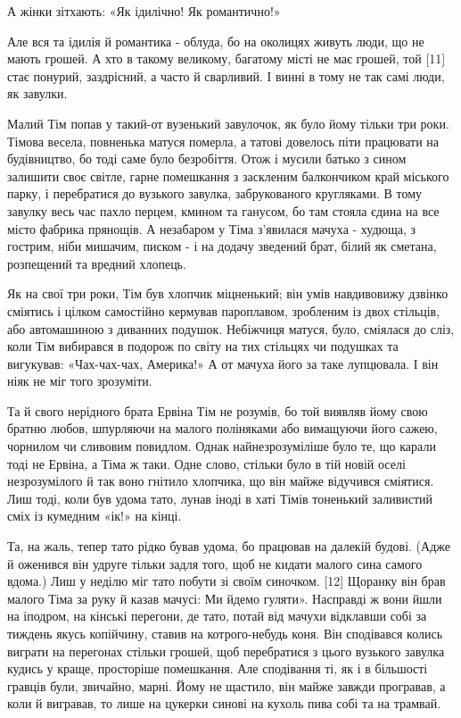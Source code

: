 А жінки зітхають: «Як ідилічно! Як романтично!»

Але вся та ідилія й романтика - облуда, бо на околицях живуть люди, що не мають
грошей. А хто в такому великому, багатому місті не має грошей, той [11] стає
понурий, заздрісний, а часто й сварливий. І винні в тому не так самі люди, як
завулки.

Малий Тім попав у такий-от вузенький завулочок, як було йому тільки три роки.
Тімова весела, повненька матуся померла, а татові довелось піти працювати на
будівництво, бо тоді саме було безробіття. Отож і мусили батько з сином
залишити своє світле, гарне помешкання з заскленим балкончиком край міського
парку, і перебратися до вузького завулка, забрукованого кругляками. В тому
завулку весь час пахло перцем, кмином та ганусом, бо там стояла єдина на все
місто фабрика прянощів. А незабаром у Тіма з'явилася мачуха - худюща, з
гострим, ніби мишачим, писком - і на додачу зведений брат, білий як сметана,
розпещений та вредний хлопець.

Як на свої три роки, Тім був хлопчик міцненький; він умів навдивовижу дзвінко
сміятись і цілком самостійно кермував пароплавом, зробленим із двох стільців,
або автомашиною з диванних подушок. Небіжчиця матуся, було, сміялася до сліз,
коли Тім вибирався в подорож по світу на тих стільцях чи подушках та вигукував:
«Чах-чах-чах, Америка!» А от мачуха його за таке лупцювала. І він ніяк не міг
того зрозуміти.

Та й свого нерідного брата Ервіна Тім не розумів, бо той виявляв йому свою
братню любов, шпурляючи на малого поліняками або вимащуючи його сажею, чорнилом
чи сливовим повидлом. Однак найнезрозуміліше було те, що карали тоді не Ервіна,
а Тіма ж таки. Одне слово, стільки було в тій новій оселі незрозумілого й так
воно гнітило хлопчика, що він майже відучився сміятися. Лиш тоді, коли був
удома тато, лунав іноді в хаті Тімів тоненький заливистий сміх із кумедним
«ік!» на кінці.

Та, на жаль, тепер тато рідко бував удома, бо працював на далекій будові. (Адже
й оженився він удруге тільки задля того, щоб не кидати малого сина самого
вдома.) Лиш у неділю міг тато побути зі своїм синочком. [12] Щоранку він брав
малого Тіма за руку й казав мачусі: Ми йдемо гуляти». Насправді ж вони йшли на
іподром, на кінські перегони, де тато, потай від мачухи відклавши собі за
тиждень якусь копійчину, ставив на котрого-небудь коня. Він сподівався колись
виграти на перегонах стільки грошей, щоб перебратися з цього вузького завулка
кудись у краще, просторіше помешкання. Але сподівання ті, як і в більшості
гравців були, звичайно, марні. Йому не щастило, він майже завжди програвав, а
коли й вигравав, то лише на цукерки синові на кухоль пива собі та на трамвай.

